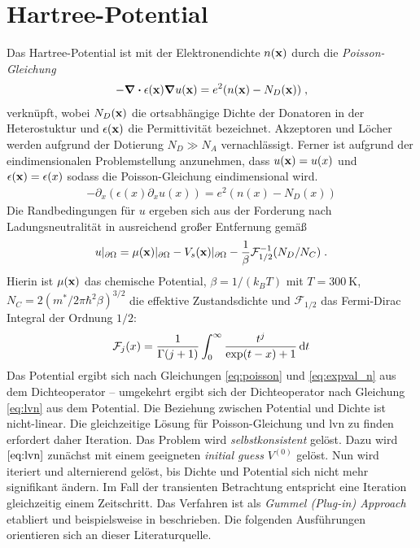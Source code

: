 \section{Hartree-Potential}\label{sec:A_4}
Das Hartree-Potential ist mit der Elektronendichte $n(\vb{x})$ durch die \emph{Poisson-Gleichung} \cite{frensley}
\begin{align}
  -\div \epsilon(\vb{x}) \grad u(\vb{x}) = e^2 (n(\vb{x}) - N_D(\vb{x})) \; ,
  \label{eq:poisson_3d}
\end{align}
verknüpft, wobei $N_D(\vb{x})$ die ortsabhängige Dichte der Donatoren in der Heterostuktur und $\epsilon(\vb{x})$ die Permittivität bezeichnet. Akzeptoren und Löcher werden aufgrund der Dotierung $N_D \gg N_A$ vernachlässigt. Ferner ist aufgrund der eindimensionalen Problemstellung anzunehmen, dass $u(\vb{x}) = u(x)$ und $\epsilon(\vb{x})=\epsilon(x)$ sodass die Poisson-Gleichung eindimensional wird.
\begin{align}
  -\partial_x (\epsilon(x)\partial_x u(x)) = e^2(n(x)-N_D(x))
  \label{eq:poisson}
\end{align}
Die Randbedingungen für $u$ ergeben sich aus der Forderung nach Ladungsneutralität in ausreichend großer Entfernung gemäß \cite{frensley}
\begin{align}
  u|_{\partial\Omega} = \mu(\vb{x})|_{\partial\Omega}-V_s(\vb{x})|_{\partial\Omega}-\frac{1}{\beta}\mathcal{F}_{1/2}^{-1}(N_D/N_C) \; .
  \label{eq:RB_PE}
\end{align}
Hierin ist $\mu(\vb{x})$ das chemische Potential, $\beta=1/(k_BT)$ mit $T=\SI{300}{\kelvin}$, $N_C = 2(m^*/2\pi\hbar^2\beta)^{3/2}$ die effektive Zustandsdichte und $\mathcal{F}_{1/2}$ das Fermi-Dirac Integral der Ordnung $1/2$:
\begin{align}
  \mathcal{F}_j(x)=\frac{1}{\Gamma(j+1)}\int_0^{\infty}\frac{t^j}{\exp(t-x)+1}\mathop{}\!\mathrm{d} t
\end{align}
Das Potential ergibt sich nach Gleichungen \eqref{eq:poisson} und \eqref{eq:expval_n} aus dem Dichteoperator -- umgekehrt ergibt sich der Dichteoperator nach Gleichung \eqref{eq:lvn} aus dem Potential. Die Beziehung zwischen Potential und Dichte ist nicht-linear. Die gleichzeitige Lösung für Poisson-Gleichung und \ac{lvn} zu finden erfordert daher Iteration. Das Problem wird \emph{selbstkonsistent} gelöst. Dazu wird $\eqref{eq:lvn}$ zunächst mit einem geeigneten \emph{initial guess} $V^{(0)}$ gelöst. Nun wird iteriert und alternierend gelöst, bis Dichte und Potential sich nicht mehr signifikant ändern. Im Fall der transienten Betrachtung entspricht eine Iteration gleichzeitig einem Zeitschritt. Das Verfahren ist als \emph{Gummel (Plug-in) Approach} etabliert und beispielsweise in \cite{gummel} beschrieben. Die folgenden Ausführungen orientieren sich an dieser Literaturquelle.

